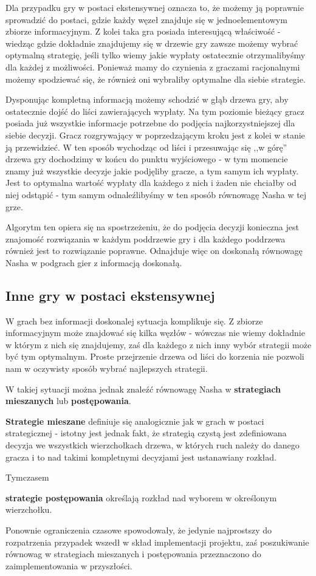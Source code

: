 \documentclass[polish]{standalone}
\begin{document}
Dla przypadku gry w postaci ekstensywnej oznacza to, że możemy ją poprawnie sprowadzić do postaci, gdzie każdy węzeł
znajduje się w jednoelementowym zbiorze informacyjnym. Z kolei taka gra posiada interesującą właściwość - wiedząc gdzie
dokładnie znajdujemy się w drzewie gry zawsze możemy wybrać optymalną strategię, jeśli tylko wiemy jakie wypłaty
ostatecznie otrzymalibyśmy dla każdej z możliwości. Ponieważ mamy do czynienia z graczami racjonalnymi możemy spodziewać
się, że również oni wybraliby optymalne dla siebie strategie.

Dysponując kompletną informacją możemy schodzić w głąb drzewa gry, aby ostatecznie dojść do liści zawierających wypłaty.
Na tym poziomie bieżący gracz posiada już wszystkie informacje potrzebne do podjęcia najkorzystniejszej dla siebie
decyzji. Gracz rozgrywający w poprzedzającym kroku jest z kolei w stanie ją przewidzieć. W ten sposób wychodząc od liści
i przesuwając się ,,w górę'' drzewa gry dochodzimy w końcu do punktu wyjściowego - w tym momencie znamy już wszystkie
decyzje jakie podjęliby gracze, a tym samym ich wypłaty. Jest to optymalna wartość wypłaty dla każdego z nich i żaden
nie chciałby od niej odstąpić - tym samym odnaleźlibyśmy w ten sposób równowagę Nasha w tej grze.

Algorytm ten opiera się na spostrzeżeniu, że do podjęcia decyzji konieczna jest znajomość rozwiązania w każdym poddrzewie
gry i dla każdego poddrzewa również jest to rozwiązanie poprawne. Odnajduje więc on doskonałą równowagę Nasha w podgrach
gier z informacją doskonałą.

\subsection{Inne gry w postaci ekstensywnej}

W grach bez informacji doskonalej sytuacja komplikuje się. Z zbiorze informacyjnym może znajdować się kilka węzłów -
wówczas nie wiemy dokładnie w którym z nich się znajdujemy, zaś dla każdego z nich inny wybór strategii może być tym
optymalnym. Proste przejrzenie drzewa od liści do korzenia nie pozwoli nam w oczywisty sposób wybrać najlepszych
strategii.

W takiej sytuacji można jednak znaleźć równowagę Nasha w \textbf{strategiach mieszanych} lub \textbf{postępowania}.

\begin{definition}
\textbf{Strategie mieszane} definiuje się analogicznie jak w grach w postaci strategicznej - istotny jest jednak fakt,
że strategią czystą jest zdefiniowana decyzja we wszystkich wierzchołkach drzewa, w których ruch należy do danego gracza
i to nad takimi kompletnymi decyzjami jest ustanawiany rozkład.
\end{definition}

Tymczasem
\begin{definition}
\textbf{strategie postępowania} określają rozkład nad wyborem w określonym wierzchołku.
\end{definition}

Ponownie ograniczenia czasowe spowodowały, że jedynie najprostszy do rozpatrzenia przypadek wszedł w skład implementacji
projektu, zaś poszukiwanie równowag w strategiach mieszanych i postępowania przeznaczono do zaimplementowania
w przyszłości.
\end{document}

